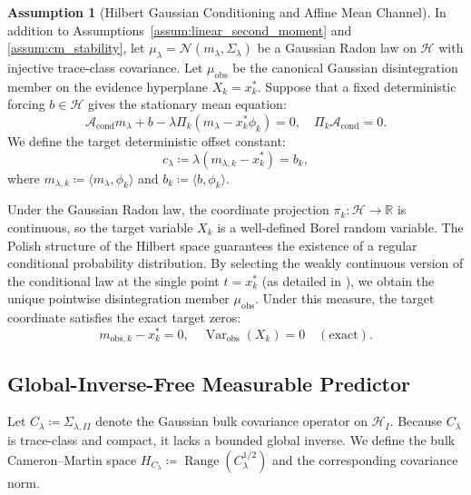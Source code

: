\documentclass[11pt]{amsart}
\theoremstyle{plain}
\theoremstyle{definition}
\newtheorem{assumption}[theorem]{Assumption}
\theoremstyle{remark}
\newcommand{\cond}{\operatorname{cond}}
\newcommand{\Var}{\operatorname{Var}}
\begin{document}
\begin{assumption}[Hilbert Gaussian Conditioning and Affine Mean Channel]
  \label{assum:gaussian_clamp}
  In addition to Assumptions~\ref{assum:linear_second_moment} and \ref{assum:cm_stability}, let $\mu_\lambda = \mathcal{N}(m_\lambda, \Sigma_\lambda)$ be a Gaussian Radon law on $\mathcal{H}$ with injective trace-class covariance. Let $\mu_{\mathrm{obs}}$ be the canonical Gaussian disintegration member on the evidence hyperplane $X_k = x_k^*$. Suppose that a fixed deterministic forcing $b \in \mathcal{H}$ gives the stationary mean equation:
  \begin{equation}
    \mathcal{A}_{\cond} m_\lambda + b - \lambda \Pi_k (m_\lambda - x_k^* \phi_k) = 0, \quad \Pi_k \mathcal{A}_{\cond} = 0.
  \end{equation}
  We define the target deterministic offset constant:
  \begin{equation}
    c_\lambda \coloneqq \lambda(m_{\lambda,k} - x_k^*) = b_k,
  \end{equation}
  where $m_{\lambda,k} \coloneqq \langle m_\lambda, \phi_k \rangle$ and $b_k \coloneqq \langle b, \phi_k \rangle$.
\end{assumption}

Under the Gaussian Radon law, the coordinate projection $\pi_k: \mathcal{H} \to \mathbb{R}$ is continuous, so the target variable $X_k$ is a well-defined Borel random variable. The Polish structure of the Hilbert space guarantees the existence of a regular conditional probability distribution. 
By selecting the weakly continuous version of the conditional law at the single point $t = x_k^*$ (as detailed in ), we obtain the unique pointwise disintegration member $\mu_{\mathrm{obs}}$. Under this measure, the target coordinate satisfies the exact target zeros:
\begin{equation}
  \label{eq:exact_target_zeros}
  m_{\text{obs},k} - x_k^* = 0, \quad \Var_{\text{obs}}(X_k) = 0 \quad (\text{exact}).
\end{equation}

\subsection{Global-Inverse-Free Measurable Predictor}
\label{sec:gaussian:predictor}

Let $C_\lambda \coloneqq \Sigma_{\lambda,II}$ denote the Gaussian bulk covariance operator on $\mathcal{H}_I$. Because $C_\lambda$ is trace-class and compact, it lacks a bounded global inverse. We define the bulk Cameron--Martin space $H_{C_\lambda} \coloneqq \operatorname{Range}(C_\lambda^{1/2})$ and the corresponding covariance norm.
\end{document}
